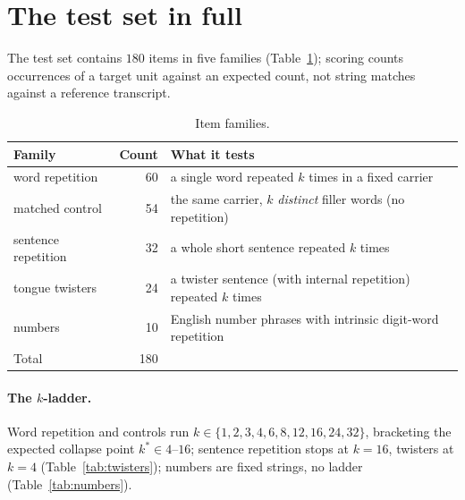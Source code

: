 \section{The test set in full}
\label{sec:testset}

The test set contains $180$ items in five families
(Table~\ref{tab:families}); scoring counts occurrences of a target unit
against an expected count, not string matches against a reference
transcript.

\begin{table}[htbp]
\centering
\caption{Item families.}
\label{tab:families}
\begin{tabular}{lrl}
\toprule
Family & Count & What it tests \\
\midrule
word repetition & 60 & a single word repeated $k$ times in a fixed carrier \\
matched control & 54 & the same carrier, $k$ \emph{distinct} filler words (no repetition) \\
sentence repetition & 32 & a whole short sentence repeated $k$ times \\
tongue twisters & 24 & a twister sentence (with internal repetition) repeated $k$ times \\
numbers & 10 & English number phrases with intrinsic digit-word repetition \\
\midrule
Total & 180 & \\
\bottomrule
\end{tabular}
\end{table}

\paragraph{The $k$-ladder.} Word repetition and controls run
$k \in \{1,2,3,4,6,8,12,16,24,32\}$, bracketing the expected collapse
point $k^\ast \in 4$--$16$; sentence repetition stops at $k=16$, twisters
at $k=4$ (Table~\ref{tab:twisters}); numbers are fixed strings, no
ladder (Table~\ref{tab:numbers}).

